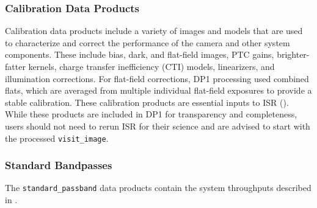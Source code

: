 \subsubsection{Calibration Data Products}
\label{ssec:calibration_data}
Calibration data products include a variety of images and models that are used to characterize and correct the performance of the \gls{camera} and other system components.
These include bias, dark, and flat-field images, \gls{PTC} gains, brighter-fatter kernels, charge transfer inefficiency (\gls{CTI}) models, linearizers, and illumination corrections.
For flat-field corrections, \gls{DP1} processing used combined flats, which are averaged from multiple individual flat-field exposures to provide a stable \gls{calibration}. These \gls{calibration} products are essential inputs to \gls{ISR} (). While these products are included in \gls{DP1} for transparency and completeness, users should not need to rerun ISR for their science and are advised to start with the processed \texttt{visit\_image}.

\subsubsection{Standard Bandpasses}
\label{ssec:bandpasses_dataproducts}
The \texttt{standard\_passband} data products contain the system throughputs described in .

% 



